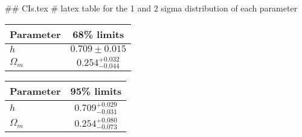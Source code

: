## CIs.tex
# latex table for the 1 and 2 sigma distribution of each parameter

\begin{tabular} { l  c}
 Parameter &  68\% limits\\
\hline
{\boldmath$h              $} & $0.709\pm 0.015            $\\
{\boldmath$\Omega_m       $} & $0.254^{+0.032}_{-0.044}   $\\
\hline
\end{tabular}

\begin{tabular} { l  c}
 Parameter &  95\% limits\\
\hline
{\boldmath$h              $} & $0.709^{+0.029}_{-0.031}   $\\
{\boldmath$\Omega_m       $} & $0.254^{+0.080}_{-0.073}   $\\
\hline
\end{tabular}
